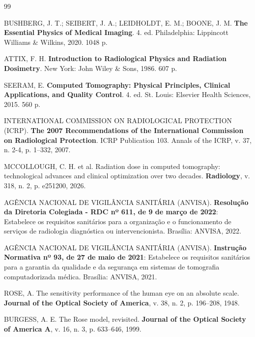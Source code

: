 \documentclass[
  12pt,
  a4paper,
  oneside
]{report}
\begin{document}
\begin{thebibliography}{99}

BUSHBERG, J. T.; SEIBERT, J. A.; LEIDHOLDT, E. M.; BOONE, J. M. \textbf{The Essential Physics of Medical Imaging}. 4. ed. Philadelphia: Lippincott Williams \& Wilkins, 2020. 1048 p.

ATTIX, F. H. \textbf{Introduction to Radiological Physics and Radiation Dosimetry}. New York: John Wiley \& Sons, 1986. 607 p.

SEERAM, E. \textbf{Computed Tomography: Physical Principles, Clinical Applications, and Quality Control}. 4. ed. St. Louis: Elsevier Health Sciences, 2015. 560 p.

INTERNATIONAL COMMISSION ON RADIOLOGICAL PROTECTION (ICRP). \textbf{The 2007 Recommendations of the International Commission on Radiological Protection}. ICRP Publication 103. Annals of the ICRP, v. 37, n. 2-4, p. 1--332, 2007.

MCCOLLOUGH, C. H. et al. Radiation dose in computed tomography: technological advances and clinical optimization over two decades. \textbf{Radiology}, v. 318, n. 2, p. e251200, 2026.

AGÊNCIA NACIONAL DE VIGILÂNCIA SANITÁRIA (ANVISA). \textbf{Resolução da Diretoria Colegiada - RDC nº 611, de 9 de março de 2022}: Estabelece os requisitos sanitários para a organização e o funcionamento de serviços de radiologia diagnóstica ou intervencionista. Brasília: ANVISA, 2022.

AGÊNCIA NACIONAL DE VIGILÂNCIA SANITÁRIA (ANVISA). \textbf{Instrução Normativa nº 93, de 27 de maio de 2021}: Estabelece os requisitos sanitários para a garantia da qualidade e da segurança em sistemas de tomografia computadorizada médica. Brasília: ANVISA, 2021.

ROSE, A. The sensitivity performance of the human eye on an absolute scale. \textbf{Journal of the Optical Society of America}, v. 38, n. 2, p. 196--208, 1948.

BURGESS, A. E. The Rose model, revisited. \textbf{Journal of the Optical Society of America A}, v. 16, n. 3, p. 633--646, 1999.


\end{thebibliography}
\end{document}
